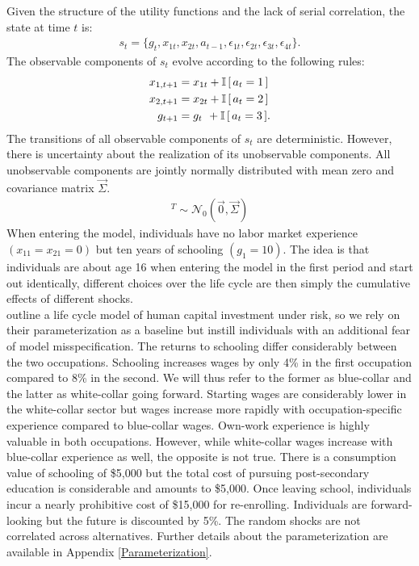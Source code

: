 \noindent Given the structure of the utility functions and the lack of serial correlation, the state at time $t$ is:
%
\begin{align*}
s_t = \{g_t,x_{1t},x_{2t},a_{t - 1},\epsilon_{1t},\epsilon_{2t},\epsilon_{3t},\epsilon_{4t}\}.
\end{align*}
%
The observable components of $s_t$ evolve according to the following rules:
%
\begin{align*}
    x_{1,t+1}  &= x_{1t} + \mathbb{I}\,[\,a_t = 1\,] \\
x_{2,t+1} &= x_{2t} + \mathbb{I}\,[\,a_t = 2\,] \\
g_{t+1}   &= g_{t\phantom{2}}    +  \mathbb{I}\,[\,a_t = 3\,].
\end{align*}
%
The transitions of all observable components of $s_t$ are deterministic. However, there is uncertainty about the realization of its unobservable components. All unobservable components are jointly normally distributed with mean zero and covariance matrix $\vec{\Sigma}$.
%
\begin{align*}
[\epsilon_{1t}, \epsilon_{2t}, \epsilon_{3t}, \epsilon_{4t}]^T \sim \mathcal{N}_0(\vec{0}, \vec{\Sigma})
\end{align*}
%
When entering the model, individuals have no labor market experience $(x_{11} = x_{21} = 0)$ but ten years of schooling $(g_1 = 10)$. The idea is that individuals are about age 16 when entering the model in the first period and start out identically, different choices over the life cycle are then simply the cumulative effects of different shocks.\\

\noindent\citet{Keane.1994} outline a life cycle model of human capital investment under risk, so we rely on their parameterization as a baseline but instill individuals with an additional fear of model misspecification. The returns to schooling differ considerably between the two occupations. Schooling increases wages by only 4\% in the first occupation compared to 8\% in the second. We will thus refer to the former as blue-collar and the latter as white-collar going forward. Starting wages are considerably lower in the white-collar sector but wages increase more rapidly with occupation-specific experience compared to blue-collar wages. Own-work experience is highly valuable in both occupations. However, while white-collar wages increase with blue-collar experience as well, the opposite is not true. There is a consumption value of schooling of \$5,000 but the total cost of pursuing post-secondary education is considerable and amounts to \$5,000. Once leaving school, individuals incur a nearly prohibitive cost of \$15,000 for re-enrolling. Individuals are forward-looking but the future is discounted by 5\%. The random shocks are not correlated across alternatives. Further details about the parameterization are available in Appendix \ref{Parameterization}.\\


